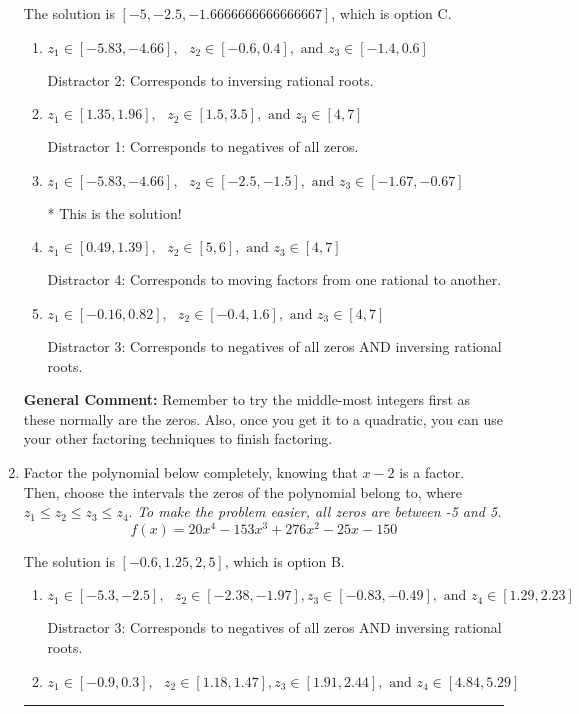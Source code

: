 \documentclass{extbook}[14pt]
\newcommand{\litem}[1]{\item #1

\rule{\textwidth}{0.4pt}}
\begin{document}
\begin{enumerate}
{The solution is \( [-5, -2.5, -1.6666666666666667] \), which is option C.\begin{enumerate}[label=\Alph*.]
\item \( z_1 \in [-5.83, -4.66], \text{   }  z_2 \in [-0.6, 0.4], \text{   and   } z_3 \in [-1.4, 0.6] \)

 Distractor 2: Corresponds to inversing rational roots.
\item \( z_1 \in [1.35, 1.96], \text{   }  z_2 \in [1.5, 3.5], \text{   and   } z_3 \in [4, 7] \)

 Distractor 1: Corresponds to negatives of all zeros.
\item \( z_1 \in [-5.83, -4.66], \text{   }  z_2 \in [-2.5, -1.5], \text{   and   } z_3 \in [-1.67, -0.67] \)

* This is the solution!
\item \( z_1 \in [0.49, 1.39], \text{   }  z_2 \in [5, 6], \text{   and   } z_3 \in [4, 7] \)

 Distractor 4: Corresponds to moving factors from one rational to another.
\item \( z_1 \in [-0.16, 0.82], \text{   }  z_2 \in [-0.4, 1.6], \text{   and   } z_3 \in [4, 7] \)

 Distractor 3: Corresponds to negatives of all zeros AND inversing rational roots.
\end{enumerate}

\textbf{General Comment:} Remember to try the middle-most integers first as these normally are the zeros. Also, once you get it to a quadratic, you can use your other factoring techniques to finish factoring.
}
\litem{
Factor the polynomial below completely, knowing that $x-2$ is a factor. Then, choose the intervals the zeros of the polynomial belong to, where $z_1 \leq z_2 \leq z_3 \leq z_4$. \textit{To make the problem easier, all zeros are between -5 and 5.}
\[ f(x) = 20x^{4} -153 x^{3} +276 x^{2} -25 x -150 \]

The solution is \( [-0.6, 1.25, 2, 5] \), which is option B.\begin{enumerate}[label=\Alph*.]
\item \( z_1 \in [-5.3, -2.5], \text{   }  z_2 \in [-2.38, -1.97], z_3 \in [-0.83, -0.49], \text{   and   } z_4 \in [1.29, 2.23] \)

 Distractor 3: Corresponds to negatives of all zeros AND inversing rational roots.
\item \( z_1 \in [-0.9, 0.3], \text{   }  z_2 \in [1.18, 1.47], z_3 \in [1.91, 2.44], \text{   and   } z_4 \in [4.84, 5.29] \)


\end{enumerate}}
\end{enumerate}
\end{document}
